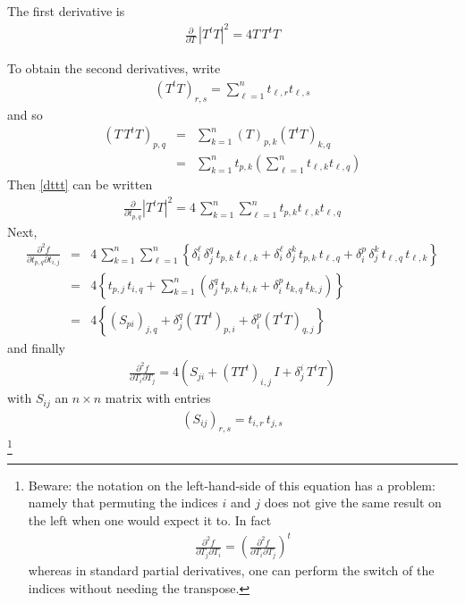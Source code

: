 \documentclass{report}
\begin{document}
\noindent The first derivative is
\begin{eqnarray}
\frac{\partial}{\partial T} \, |T^t T|^2 = 4 T \, T^t T \label{dttt}
\end{eqnarray}

\noindent To obtain the second derivatives, write
\begin{eqnarray}
\left( T^t T \right)_{r,s} = \sum_{\ell=1}^n t_{\ell,r} t_{\ell,s} 
\end{eqnarray}
and so
\begin{eqnarray}
\left( T \, T^t T \right)_{p,q} & = & \sum_{k=1}^n (T)_{p,k} \left( T^t T \right)_{k,q} \\
 & = & \sum_{k=1}^n t_{p,k} \left( \sum_{\ell=1}^n t_{\ell,k} t_{\ell,q} \right)
\end{eqnarray}
Then \ref{dttt} can be written
\begin{eqnarray}
\frac{\partial}{\partial t_{p,q}} |T^t T|^2 = 4 \, \sum_{k=1}^n \sum_{\ell=1}^n  t_{p,k} t_{\ell,k} t_{\ell,q} 
\end{eqnarray}
Next,
\begin{eqnarray} 
\frac{\partial^2 f}{\partial t_{p,q} \partial t_{i,j}} & = & 4\, \sum_{k=1}^n \sum_{\ell=1}^n  \left\{ \delta_i^\ell \, \delta_j^q \, t_{p,k} \, t_{\ell,k} + \delta_i^\ell \, \delta_j^k \, t_{p,k} \, t_{\ell,q} + \delta_i^p \, \delta_j^k \, t_{\ell,q} \, t_{\ell,k} \right\} \nonumber \\
 & = & 4 \left\{ t_{p,j} \, t_{i,q} + \sum_{k=1}^n \left( \delta_j^q \, t_{p,k} \, t_{i,k} + \delta_i^p \, t_{k,q} \, t_{k,j} \right) \right\} \\
& = & 4 \left\{ \left( S_{pi} \right)_{j,q} + \delta_j^q (T T^t)_{p,i} + \delta_i^p (T^t T)_{q,j}\right\}
\end{eqnarray}
and finally
\begin{eqnarray}
\label{hessttt}
\frac{\partial^2 f}{\partial T_i \partial T_j} = 4 \left( S_{ji} + (T T^t)_{i,j} \, I + \delta_j^i \, T^t T \right)
\end{eqnarray}
with $S_{ij}$ an $n \times n$ matrix with entries
\begin{eqnarray}
\left( S_{ij} \right)_{r,s} = t_{i,r} \, t_{j,s} \label{sij}
\end{eqnarray}
\footnote{Beware: the notation on the left-hand-side of this equation has a problem: namely that permuting the indices $i$ and $j$ 
does not give the same result on the left when one would expect it to. In fact
\begin{eqnarray}
\frac{\partial^2 f}{\partial T_j \partial T_i} = \left( \frac{\partial^2 f}{\partial T_i \partial T_j} \right)^t
\end{eqnarray}
whereas in standard partial derivatives, one can perform the switch of the 
indices without needing the transpose.} \newline
\end{document}
